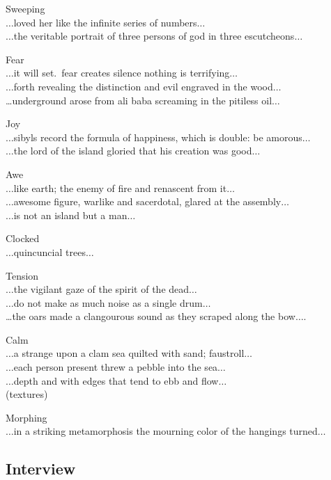 Sweeping\\
$\ldots$loved her like the infinite series of numbers$\ldots$\\
$\ldots$the veritable portrait of three persons of god in three escutcheons$\ldots$

Fear\\
$\ldots$it will set.\ fear creates silence nothing is terrifying$\ldots$\\
$\ldots$forth revealing the distinction and evil engraved in the wood$\ldots$\\
…underground arose from ali baba screaming in the pitiless oil$\ldots$

Joy\\
$\ldots$sibyls record the formula of happiness, which is double: be amorous$\ldots$\\
$\ldots$the lord of the island gloried that his creation was good$\ldots$

Awe\\
$\ldots$like earth; the enemy of fire and renascent from it$\ldots$\\
$\ldots$awesome figure, warlike and sacerdotal, glared at the assembly$\ldots$\\
$\ldots$is not an island but a man$\ldots$

Clocked\\
$\ldots$quincuncial trees$\ldots$

Tension\\
$\ldots$the vigilant gaze of the spirit of the dead$\ldots$\\
$\ldots$do not make as much noise as a single drum$\ldots$\\
…the oars made a clangourous sound as they scraped along the bow$\ldots$.

Calm\\
$\ldots$a strange upon a clam sea quilted with sand; faustroll$\ldots$\\
$\ldots$each person present threw a pebble into the sea$\ldots$\\
$\ldots$depth and with edges that tend to ebb and flow$\ldots$\\
(textures)

Morphing\\
$\ldots$in a striking metamorphosis the mourning color of the hangings turned$\ldots$

\subsection{Interview}

\stopcontents[chapters]

